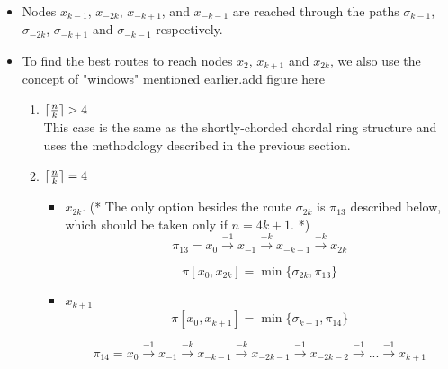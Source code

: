 \begin{itemize}

  \item  Nodes $x_{k-1}$, $x_{-2k}$, $x_{-k+1}$, and $x_{-k-1}$ are reached through the paths $\sigma_{k-1}$, $\sigma_{-2k}$, $\sigma_{-k+1}$ and $\sigma_{-k-1}$ respectively.
 



\item To find the best routes to reach nodes $x_2$, $x_{k+1}$ and $x_{2k}$, we also use the concept of "windows"  mentioned earlier.\underline{add figure here}
\begin{enumerate}


\item  $\lceil {n \over k} \rceil >  4$ \\
This case is the same as the shortly-chorded chordal ring structure and uses the methodology described in the previous section.

\item  $\lceil {n \over k} \rceil=  4$ 
 
      
  \begin{itemize}    
\item $x_{2k}$.  (* The only option   besides the route $ \sigma_{2k}$ is  $\pi_{13}$ described below, which should be taken only   if $n=4k+1$. *)
 $$\pi_{13} = x_{0} \xrightarrow {-1} x_{-1} \xrightarrow {-k} x_{-k-1} \xrightarrow {-k} x_{2k}$$
 
 $$ \pi[x_0,x_{2k}] = \min \{   \sigma_{2k}, \pi_{13}\}$$

 \item $x_{k+1}$ \\
 
  $$ \pi[x_0,x_{k+1}] = \min \{   \sigma_{k+1}, \pi_{14}\}$$
  
$$\pi_{14} = x_{0} \xrightarrow {-1} x_{-1} \xrightarrow {-k} x_{-k-1} \xrightarrow {-k} x_{-2k-1} \xrightarrow {-1} x_{-2k-2}\xrightarrow {-1} ... \xrightarrow {-1} x_{k+1}$$

 






\end{itemize}
\end{enumerate}
\end{itemize}
